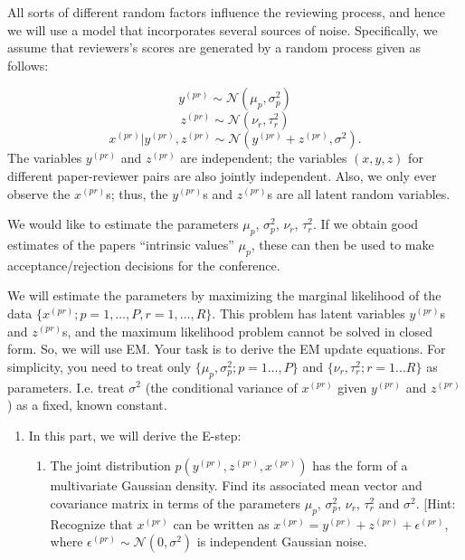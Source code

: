 \documentclass[11pt]{article}
\begin{document}
\begin{enumerate}
All sorts of different random factors influence the reviewing process, and hence we will use a model that incorporates several sources of noise. Specifically, we assume that reviewers's scores are generated by a random process given as follows:

\[
y^{(pr)} \sim \mathcal{N}(\mu_p, \sigma_p^2)
\]
\[
z^{(pr)} \sim \mathcal{N}(\nu_r, \tau_r^2)
\]
\[
x^{(pr)}|y^{(pr)}, z^{(pr)} \sim\mathcal{N}(y^{(pr)}+ z^{(pr)}, \sigma^2).
\]
The variables $y^{(pr)}$ and $z^{(pr)}$ are independent; the variables $(x,y,z)$ for different paper-reviewer pairs are also jointly independent. Also, we only ever observe the $x^{(pr)}$s; thus, the $y^{(pr)}$s and $z^{(pr)}$s are all latent random variables.
 
We would like to estimate the parameters $\mu_p$, $\sigma_p^2$, $\nu_r$, $\tau_r^2$. If we obtain good estimates of the papers ``intrinsic values'' $\mu_p$, these can then be used to make acceptance/rejection decisions for the conference. 

We will estimate the parameters by maximizing the marginal likelihood of the data $\{x^{(pr)}; p = 1,\ldots,P,r = 1,\ldots,R\}$. This problem has latent variables $y^{(pr)}$s and $z^{(pr)}$s, and the maximum likelihood problem cannot be solved in closed form. So, we will use EM. Your task is to derive the EM update equations. 
For simplicity, you need to treat only $\{\mu_p,\sigma_p^2; p = 1\ldots,P\}$ and $\{\nu_r,\tau_r^2;r = 1...R\}$ as parameters. I.e. treat $\sigma^2$ (the conditional variance of $x^{(pr)}$ given $y^{(pr)}$ and $z^{(pr)}$) as a fixed, known constant.

\begin{enumerate}
\item In this part, we will derive the E-step:

\begin{enumerate}
\item  The joint distribution $p(y^{(pr)},z^{(pr)},x^{(pr)})$ has the form of a multivariate Gaussian density. Find its associated mean vector and covariance matrix in terms of the parameters $\mu_p$, $\sigma_p^2$, $\nu_r$, $\tau_r^2$ and $\sigma^2$.
[Hint: Recognize that $x^{(pr)}$ can be written as $x^{(pr)} = y^{(pr)} + z^{(pr)} + \epsilon^{(pr)}$, where $\epsilon^{(pr)} \sim \mathcal{N}(0, \sigma^2)$ is independent Gaussian noise.


\end{enumerate}
\end{enumerate}
\end{enumerate}
\end{document}
